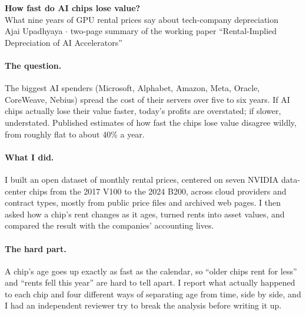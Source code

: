 \documentclass[11pt]{article}
\begin{document}
\begin{center}
{\Large\bfseries How fast do AI chips lose value?}\\[2pt]
{\large What nine years of GPU rental prices say about tech-company depreciation}\\[4pt]
Ajai Upadhyaya $\cdot$ two-page summary of the working paper ``Rental-Implied Depreciation of AI Accelerators''
\end{center}

\paragraph{The question.} The biggest AI spenders (Microsoft, Alphabet, Amazon, Meta, Oracle,
CoreWeave, Nebius) spread the cost of their servers over five to six years. If AI chips actually
lose their value faster, today's profits are overstated; if slower, understated. Published
estimates of how fast the chips lose value disagree wildly, from roughly flat to about 40\% a year.

\paragraph{What I did.} I built an open dataset of \nPanelRows{} monthly rental prices, centered on
seven NVIDIA data-center chips from the 2017 V100 to the 2024 B200, across cloud
providers and contract types, mostly from public price files and archived web pages. I then asked
how a chip's rent changes as it ages, turned rents into asset values, and compared the result
with the companies' accounting lives.

\paragraph{The hard part.} A chip's age goes up exactly as fast as the calendar, so ``older chips
rent for less'' and ``rents fell this year'' are hard to tell apart. I report what actually
happened to each chip and four different ways of separating age from time, side by side, and I
had an independent reviewer try to break the analysis before writing it up.
\end{document}
